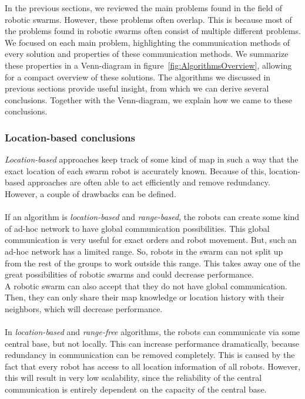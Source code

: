 
In the previous sections, we reviewed the main problems found in the field of robotic swarms. 
However, these problems often overlap.
This is because most of the problems found in robotic swarms often consist of multiple different problems. 
We focused on each main problem, highlighting the communication methods of every solution and properties of these communication methods. 
We summarize these properties in a Venn-diagram in figure~\ref{fig:AlgorithmsOverview}, allowing for a compact overview of these solutions.
The algorithms we discussed in previous sections provide useful insight, from which we can derive several conclusions.
Together with the Venn-diagram, we explain how we came to these conclusions.

\subsubsection*{Location-based conclusions} 
\emph{Location-based} approaches keep track of some kind of map in such a way that the exact location of each swarm robot is accurately known.
Because of this, location-based approaches are often able to act efficiently and remove redundancy.
However, a couple of drawbacks can be defined.\\
\\
If an algorithm is \emph{location-based} and \emph{range-based}, the robots can create some kind of ad-hoc network to have global communication possibilities.
This global communication is very useful for exact orders and robot movement. 
But, such an ad-hoc network has a limited range. 
So, robots in the swarm can not split up from the rest of the groups to work outside this range. 
This takes away one of the great possibilities of robotic swarms and could decrease performance. \\
A robotic swarm can also accept that they do not have global communication.
Then, they can only share their map knowledge or location history with their neighbors, which will decrease performance.  \\
\\
In \emph{location-based} and \emph{range-free} algorithms, the robots can communicate via some central base, but not locally. 
This can increase performance dramatically, because redundancy in communication can be removed completely.
This is caused by the fact that every robot has access to all location information of all robots.
However, this will result in very low scalability, since the reliability of the central communication is entirely dependent on the capacity of the central base.

